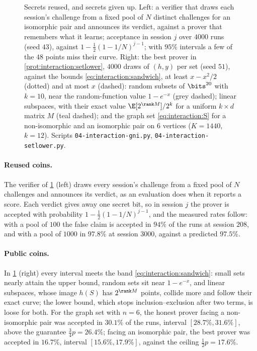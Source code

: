\begin{refsection}
\begin{figure}[t]
\begin{fullwidth}
\end{fullwidth}
\caption{Secrets reused, and secrets given up. Left: a verifier that draws each session's challenge from a fixed pool of $N$ distinct challenges for an isomorphic pair and announces its verdict, against a prover that remembers what it learns; acceptance in session $j$ over $4000$ runs (seed $43$), against $1-\frac12(1-1/N)^{j-1}$; with $95\%$ intervals a few of the $48$ points miss their curve. Right: the best prover in \cref{prot:interaction:setlower}, $4000$ draws of $(h,y)$ per set (seed $51$), against the bounds \eqref{eq:interaction:sandwich}, at least $x-x^2/2$ (dotted) and at most $x$ (dashed): random subsets of $\bits^{20}$ with $k=10$, near the random-function value $1-e^{-x}$ (grey dashed); linear subspaces, with their exact value $\E[2^{\rank M}]/2^k$ for a uniform $k\times d$ matrix $M$ (teal dashed); and the graph set \eqref{eq:interaction:S} for a non-isomorphic and an isomorphic pair on $6$ vertices ($K=1440$, $k=12$). Scripts \texttt{04-interaction-gni.py}, \texttt{04-interaction-setlower.py}.}\label{fig:interaction:secrets}
\end{figure}

\paragraph{Reused coins.} The verifier of \cref{fig:interaction:secrets} (left) draws every session's challenge from a fixed pool of $N$ challenges and announces its verdict, as an evaluation does when it reports a score. Each verdict gives away one secret bit, so in session $j$ the prover is accepted with probability $1-\frac12(1-1/N)^{j-1}$, and the measured rates follow: with a pool of $100$ the false claim is accepted in $94\%$ of the runs at session $208$, and with a pool of $1000$ in $97.8\%$ at session $3000$, against a predicted $97.5\%$.

\paragraph{Public coins.} In \cref{fig:interaction:secrets} (right) every interval meets the band \eqref{eq:interaction:sandwich}: small sets nearly attain the upper bound, random sets sit near $1-e^{-x}$, and linear subspaces, whose image $h(S)$ has $2^{\rank M}$ points, collide more and follow their exact curve; the lower bound, which stops inclusion--exclusion after two terms, is loose for both. For the graph set with $n=6$, the honest prover facing a non-isomorphic pair was accepted in $30.1\%$ of the runs, interval $[28.7\%,31.6\%]$, above the guarantee $\frac34p=26.4\%$; facing an isomorphic pair, the best prover was accepted in $16.7\%$, interval $[15.6\%,17.9\%]$, against the ceiling $\frac12p=17.6\%$.


\end{refsection}
